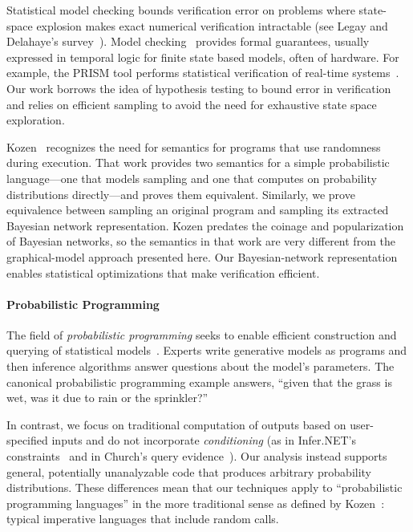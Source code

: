 Statistical model checking bounds verification error on 
problems where state-space explosion makes exact numerical
verification intractable (see Legay and Delahaye's
survey~\cite{legay10}).  Model checking~\cite{Clarke} provides formal guarantees,
usually expressed in temporal logic for finite state
based models, often of hardware. For example, the
PRISM tool performs statistical verification of real-time
systems~\cite{KNP11}. Our work borrows the idea of hypothesis
testing to bound error in verification~\cite{Younes,Younes20061368}
and
relies on efficient sampling to avoid
the need for exhaustive state space exploration.

Kozen~\cite{kozen} recognizes the need for semantics for programs
that use randomness during execution.
That work provides two semantics for a simple probabilistic
language---one that models sampling and one that computes on probability
distributions directly---and proves them equivalent.
Similarly, we prove equivalence between sampling an original program and
sampling its extracted Bayesian network representation.
Kozen predates the coinage and popularization of Bayesian networks, so
the semantics in that work are very different from the graphical-model approach
presented here.
Our Bayesian-network representation enables statistical optimizations that
make \passert verification efficient.

\paragraph{Probabilistic Programming}
The field of \emph{probabilistic programming} seeks to enable efficient
construction and querying of statistical models~\cite{BBGR13, wingate-lightweight,
  church, chaganty, pfeffersample, probdsl, koller}.  Experts write
generative models as programs and then inference algorithms answer questions
about the model's parameters. The canonical probabilistic programming example
answers, ``given that the grass is wet, was it due to rain or the sprinkler?''


In contrast, we focus on traditional computation
of outputs based on user-specified inputs and do not incorporate
\emph{conditioning} (as in Infer.NET's constraints~\cite{infernet} and in
Church's query evidence~\cite{church}). Our analysis instead supports
general, potentially unanalyzable code that produces arbitrary
probability distributions.  These differences mean that our techniques
apply to ``probabilistic programming languages'' in the more traditional sense as defined
by Kozen~\cite{kozen}: typical imperative languages that include random calls.


